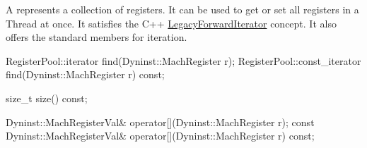 
A  represents a collection of registers.
It can be used to get or set all registers in a Thread at once.
It satisfies the C++
\href{https://en.cppreference.com/cpp/named_req/ForwardIterator}{LegacyForwardIterator}
concept. It also offers the standard  members for iteration.

\begin{apient}
RegisterPool::iterator find(Dyninst::MachRegister r);
RegisterPool::const_iterator find(Dyninst::MachRegister r) const;
\end{apient}


\begin{apient}
size_t size() const;
\end{apient}


\begin{apient}
Dyninst::MachRegisterVal& operator[](Dyninst::MachRegister r);
const Dyninst::MachRegisterVal& operator[](Dyninst::MachRegister r) const;
\end{apient}

